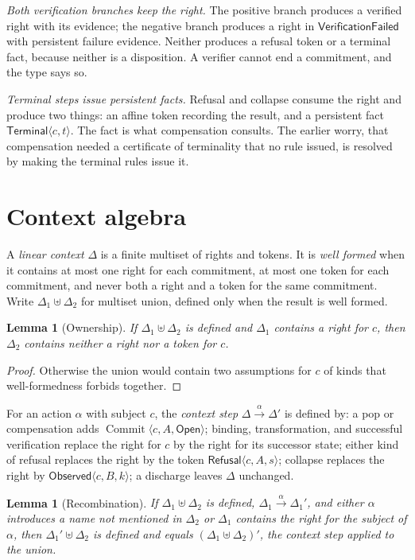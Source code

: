 \documentclass[11pt,openany]{book}
\newtheorem{lemma}[theorem]{Lemma}
\theoremstyle{remark}
\newcommand{\Commit}{\operatorname{Commit}}
\begin{document}
\emph{Both verification branches keep the right.} The positive branch
produces a verified right with its evidence; the negative branch produces
a right in $\mathsf{VerificationFailed}$ with persistent failure evidence.
Neither produces a refusal token or a terminal fact, because neither is a
disposition. A verifier cannot end a commitment, and the type says so.

\emph{Terminal steps issue persistent facts.} Refusal and collapse consume
the right and produce two things: an affine token recording the result,
and a persistent fact $\mathsf{Terminal}\langle c,t\rangle$. The fact is
what compensation consults. The earlier worry, that compensation needed a
certificate of terminality that no rule issued, is resolved by making the
terminal rules issue it.

\section{Context algebra}

A \emph{linear context} $\Delta$ is a finite multiset of rights and
tokens. It is \emph{well formed} when it contains at most one right for
each commitment, at most one token for each commitment, and never both a
right and a token for the same commitment. Write $\Delta_1\uplus\Delta_2$
for multiset union, defined only when the result is well formed.

\begin{lemma}[Ownership]\label{lem:own}
If $\Delta_1\uplus\Delta_2$ is defined and $\Delta_1$ contains a right for
$c$, then $\Delta_2$ contains neither a right nor a token for $c$.
\end{lemma}

\begin{proof}
Otherwise the union would contain two assumptions for $c$ of kinds that
well-formedness forbids together.
\end{proof}

For an action $\alpha$ with subject $c$, the \emph{context step}
$\Delta\xrightarrow{\alpha}\Delta'$ is defined by: a pop or compensation
adds $\Commit\langle c,A,\mathsf{Open}\rangle$; binding, transformation,
and successful verification replace the right for $c$ by the right for its
successor state; either kind of refusal replaces the right by the token
$\mathsf{Refusal}\langle c,A,s\rangle$; collapse replaces the right by
$\mathsf{Observed}\langle c,B,k\rangle$; a discharge leaves $\Delta$
unchanged.

\begin{lemma}[Recombination]\label{lem:recomb}
If $\Delta_1\uplus\Delta_2$ is defined, $\Delta_1\xrightarrow{\alpha}
\Delta_1'$, and either $\alpha$ introduces a name not mentioned in
$\Delta_2$ or $\Delta_1$ contains the right for the subject of $\alpha$,
then $\Delta_1'\uplus\Delta_2$ is defined and equals
$(\Delta_1\uplus\Delta_2)'$, the context step applied to the union.
\end{lemma}
\end{document}

